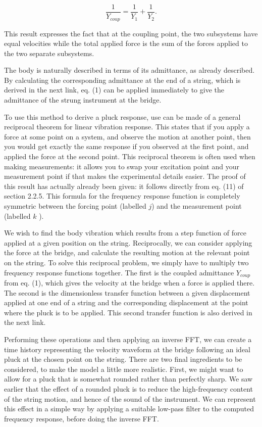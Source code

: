   $$\dfrac{1}{Y_{coup}}=\dfrac{1}{Y_1}+\dfrac{1}{Y_2} . \tag{1}$$ 

  This result expresses the fact that at the coupling point, the two subsystems 
  have equal velocities while the total applied force is the sum of the forces 
  applied to the two separate subsystems. 

  The body is naturally described in terms of its admittance, as already 
  described. By calculating the corresponding admittance at the end of a 
  string, which is derived in the next link, eq. (1) can be applied immediately 
  to give the admittance of the strung instrument at the bridge. 

  To use this method to derive a pluck response, use can be made of a general 
  reciprocal theorem for linear vibration response. This states that if you 
  apply a force at some point on a system, and observe the motion at another 
  point, then you would get exactly the same response if you observed at the 
  first point, and applied the force at the second point. This reciprocal 
  theorem is often used when making measurements: it allows you to swap your 
  excitation point and your measurement point if that makes the experimental 
  details easier. The proof of this result has actually already been given: it 
  follows directly from eq. (11) of section 2.2.5. This formula for the 
  frequency response function is completely symmetric between the forcing point 
  (labelled $j$) and the measurement point (labelled $k$ ). 

  We wish to find the body vibration which results from a step function of 
  force applied at a given position on the string. Reciprocally, we can 
  consider applying the force at the bridge, and calculate the resulting motion 
  at the relevant point on the string. To solve this reciprocal problem, we 
  simply have to multiply two frequency response functions together. The first 
  is the coupled admittance $Y_{coup}$ from eq. (1), which gives the velocity 
  at the bridge when a force is applied there. The second is the dimensionless 
  transfer function between a given displacement applied at one end of a string 
  and the corresponding displacement at the point where the pluck is to be 
  applied. This second transfer function is also derived in the next link. 

  Performing these operations and then applying an inverse FFT, we can create a 
  time history representing the velocity waveform at the bridge following an 
  ideal pluck at the chosen point on the string. There are two final 
  ingredients to be considered, to make the model a little more realistic. 
  First, we might want to allow for a pluck that is somewhat rounded rather 
  than perfectly sharp. We saw earlier that the effect of a rounded pluck is to 
  reduce the high-frequency content of the string motion, and hence of the 
  sound of the instrument. We can represent this effect in a simple way by 
  applying a suitable low-pass filter to the computed frequency response, 
  before doing the inverse FFT. 

